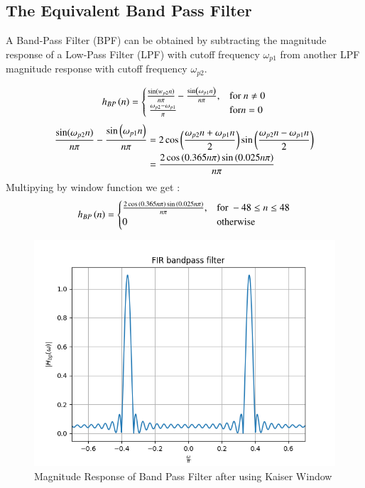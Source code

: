 \documentclass{article}
\begin{document}
\subsection{The Equivalent Band Pass Filter}
A Band-Pass Filter (BPF) can be obtained by subtracting the magnitude response of a Low-Pass Filter (LPF) with cutoff frequency $\omega_{p1}$ from another LPF magnitude response with cutoff frequency $\omega_{p2}$.

\begin{align}
    h_{BP}\left(n\right) =
\begin{cases}
    \frac{\sin(w_{p2} n)}{n\pi} -\frac{\sin\left(\omega_{p1}n\right)}{n\pi},  & \text{for } n\neq 0\\\
    \frac{\omega_{p2}-\omega_{p1}}{\pi} &\text{for} n= 0
\end{cases} \label{eq:h(n)desired_for_LPF}
\end{align}
\begin{align}
     \frac{\sin(\omega_{p2} n)}{n\pi} -\frac{\sin\left(\omega_{p1}n\right)}{n\pi} &= 2\cos{\ensuremath{\left(\frac{\omega_{p2}n+\omega_{p1}n}{2}\right)}}\sin{\ensuremath{\left(\frac{\omega_{p2}n-\omega_{p1}n}{2}\right)}}\\
            &= \frac{2\cos{\ensuremath{\left(0.365n\pi\right)}}\sin{\ensuremath{\left(0.025n\pi\right)}}}{n\pi}
\end{align}
Multipying by window function we get :
\begin{align}
    h_{BP}\left(n\right) =
\begin{cases}
   \frac{2\cos{\ensuremath{\left(0.365n\pi\right)}}\sin{\ensuremath{\left(0.025n\pi\right)}}}{n\pi},  & \text{for } -48\leq n \leq 48 \\
    0 &\text{otherwise}
\end{cases} \label{eq:h(n)desired_for_LPF}
\end{align}

\begin{figure}[h!]
\centering
\includegraphics[width=1\columnwidth]{figs/FIR_kaiser_bp.png}
\caption{Magnitude Response of Band Pass Filter after using Kaiser Window}
\label{fig:Kaiser_BPF_response}
\end{figure}
\end{document}
